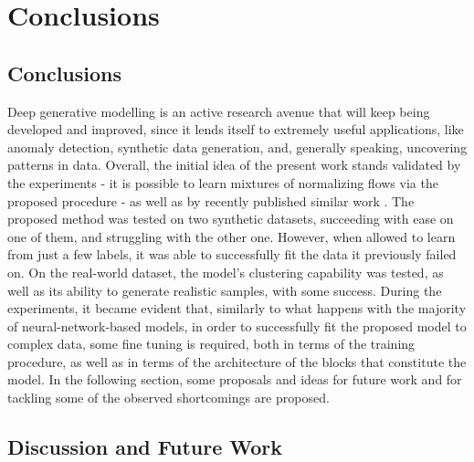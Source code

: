\chapter{Conclusions}
\label{chapter:conclusions}

\section{Conclusions}
\label{section:conclusions}
Deep generative modelling is an active research avenue that will keep being
developed and improved, since it lends itself to extremely useful applications,
like anomaly detection, synthetic data generation, and, generally speaking,
uncovering patterns in data.
Overall, the initial idea of the present work stands validated by the experiments - 
it is possible to learn mixtures of normalizing flows via the proposed procedure - as well
as by recently published similar work \autocites{RAD}{semisuplearning_nflows}.
The proposed method was tested on two synthetic datasets, succeeding with ease
on one of them, and struggling with the other one. However, when allowed to learn
from just a few labels, it was able to successfully fit the data it previously
failed on. On the real-world dataset, the model's clustering capability was tested,
as well as its ability to generate realistic samples, with some success.
During the experiments, it became evident that, similarly to what happens with
the majority of neural-network-based models, in order to successfully fit the
proposed model to complex data, some fine tuning is required, both in terms of the
training procedure, as well as in terms of the architecture of the blocks that
constitute the model. In the following section, some proposals and ideas for
future work and for tackling some of the observed shortcomings are proposed.

\section{Discussion and Future Work}
\label{section:future}

